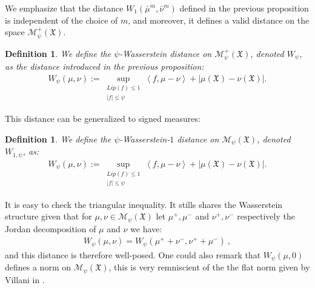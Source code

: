 \documentclass[11pt,a4paper]{article}
\newcommand{\MC}{\mathcal{M}}
\newcommand{\XF}{\mathfrak{X}}
\newcommand{\brac}[1]{\left\langle#1\right\rangle}
\newtheorem{definition}[theorem]{Definition}
\begin{document}
We emphasize that the distance $W_1(\bar{\mu}^m, \bar{\nu}^m)$ defined in the previous proposition is independent of the choice of $m$, and moreover, it defines a valid distance on the space $\MC^+_{\psi}(\XF)$.

\begin{definition}\label{def:Wasserstein-general}
We define the \emph{$\psi$-Wasserstein distance} on $\MC^+_{\psi}(\XF)$, denoted $W_{\psi}$, as the distance introduced in the previous proposition:
\begin{align*}
    W_{\psi}(\mu, \nu) := \sup_{\substack{Lip(f) \leq 1\\ |f| \leq \psi}} \brac{f, \mu - \nu} + \left| \mu(\XF) - \nu(\XF) \right|.
\end{align*}
\end{definition}
This distance can be generalized to signed measures:
\begin{definition}\label{def:Wasserstein-general-signed}
    We define the \emph{$\psi$-Wasserstein-$1$ distance} on $\MC_{\psi}(\XF)$, denoted $W_{1,\psi}$, as:
\begin{align*}
    W_{\psi}(\mu, \nu) := \sup_{\substack{Lip(f) \leq 1\\ |f| \leq \psi}} \brac{f, \mu - \nu} + \left| \mu(\XF) - \nu(\XF) \right|.
\end{align*}
\end{definition}
It is easy to check the triangular inequality. It stills shares the Wasserstein structure given that for $\mu,\nu \in \MC_{\psi}(\XF)$ let $\mu^+,\mu^-$ and $\nu^+,\nu^-$ respectively the Jordan decomposition of $\mu$ and $\nu$ we have:
\begin{align*}
    W_{\psi}(\mu, \nu) = W_{\psi}(\mu^+ + \nu^-, \nu^+ + \mu^-)\ ,
\end{align*}
and this distance is therefore well-posed. One could also remark that $W_{\psi}(\mu,0)$ defines a norm on $\MC_{\psi}(\XF)$, this is very remniscient of the the flat norm given by Villani in \cite{villani2008optimal}.
\end{document}

